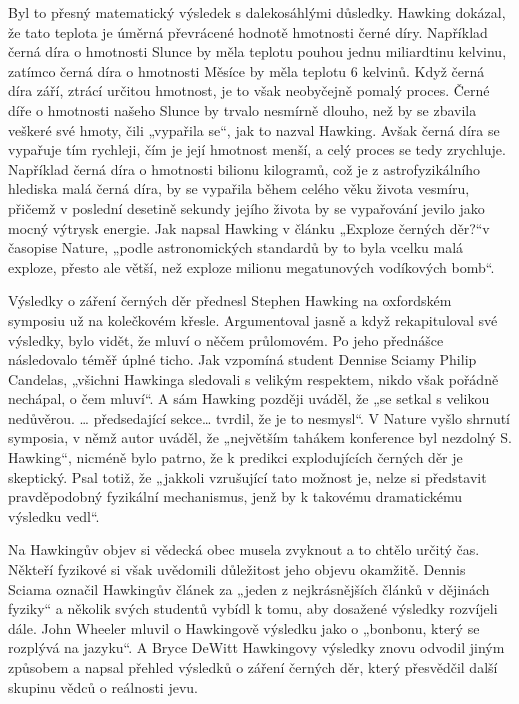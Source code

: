   Byl to přesný matematický výsledek s dalekosáhlými důsledky. Hawking dokázal, že tato teplota je
  úměrná převrácené hodnotě hmotnosti černé díry. Například černá díra o hmotnosti Slunce by měla
  teplotu pouhou jednu miliardtinu kelvinu, zatímco černá díra o hmotnosti Měsíce by měla teplotu 6
  kelvinů. Když černá díra září, ztrácí určitou hmotnost, je to však neobyčejně pomalý proces. Černé
  díře o hmotnosti našeho Slunce by trvalo nesmírně dlouho, než by se zbavila veškeré své hmoty,
  čili „vypařila se“, jak to nazval Hawking. Avšak černá díra se vypařuje tím rychleji, čím je její
  hmotnost menší, a celý proces se tedy zrychluje. Například černá díra o hmotnosti bilionu
  kilogramů, což je z astrofyzikálního hlediska malá černá díra, by se vypařila během celého věku
  života vesmíru, přičemž v poslední desetině sekundy jejího života by se vypařování jevilo jako
  mocný výtrysk energie. Jak napsal Hawking v článku „Exploze černých děr?“v časopise Nature, „podle
  astronomických standardů by to byla vcelku malá exploze, přesto ale větší, než exploze milionu
  megatunových vodíkových bomb“. 
  
  Výsledky o záření černých děr přednesl Stephen Hawking na oxfordském symposiu už na kolečkovém
  křesle. Argumentoval jasně a když rekapituloval své výsledky, bylo vidět, že mluví o něčem
  průlomovém. Po jeho přednášce následovalo téměř úplné ticho. Jak vzpomíná student Dennise Sciamy
  Philip Candelas, „všichni Hawkinga sledovali s velikým respektem, nikdo však pořádně nechápal, o
  čem mluví“. A sám Hawking později uváděl, že „se setkal s velikou nedůvěrou. … předsedající sekce…
  tvrdil, že je to nesmysl“. V Nature vyšlo shrnutí symposia, v němž autor uváděl, že „největším
  tahákem konference byl nezdolný S. Hawking“, nicméně bylo patrno, že k predikci explodujících
  černých děr je skeptický. Psal totiž, že „jakkoli vzrušující tato možnost je, nelze si představit
  pravděpodobný fyzikální mechanismus, jenž by k takovému dramatickému výsledku vedl“. 
  
  Na Hawkingův objev si vědecká obec musela zvyknout a to chtělo určitý čas. Někteří fyzikové si
  však uvědomili důležitost jeho objevu okamžitě. Dennis Sciama označil Hawkingův článek za „jeden z
  nejkrásnějších článků v dějinách fyziky“ a několik svých studentů vybídl k tomu, aby dosažené
  výsledky rozvíjeli dále. John Wheeler mluvil o Hawkingově výsledku jako o „bonbonu, který se
  rozplývá na jazyku“. A Bryce DeWitt Hawkingovy výsledky znovu odvodil jiným způsobem a napsal
  přehled výsledků o záření černých děr, který přesvědčil další skupinu vědců o reálnosti jevu. 
  
